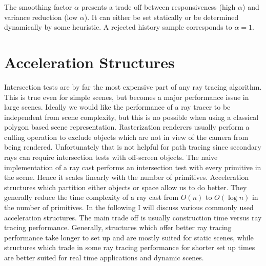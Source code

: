 \documentclass{ACGSeminar}
\begin{document}
The smoothing factor $\alpha$ presents a trade off between responsiveness (high $\alpha$) and variance reduction (low $\alpha$). It can either be set statically or be determined dynamically by some heuristic. A rejected history sample corresponds to $\alpha = 1$. 


\section{Acceleration Structures} \label{acceleration}
Intersection tests are by far the most expensive part of any ray tracing algorithm. \cite[7]{Whitted:1980} This is true even for simple scenes, but becomes a major performance issue in large scenes. Ideally we would like the performance of a ray tracer to be independent from scene complexity, but this is no possible when using a classical polygon based scene representation.
Rasterization renderers usually perform a culling operation to exclude objects which are not in view of the camera from being rendered. Unfortunately that is not helpful for path tracing since secondary rays can require intersection tests with off-screen objects.
The naive implementation of a ray cast performs an intersection test with every primitive in the scene. Hence it scales linearly with the number of primitives. Acceleration structures which partition either objects or space allow us to do better. They generally reduce the time complexity of a ray cast from $O(n)$ to $O(\log n)$ in the number of primitives. In the following I will discuss various commonly used acceleration structures. The main trade off is usually construction time versus ray tracing performance. Generally, structures which offer better ray tracing performance take longer to set up and are mostly suited for static scenes, while structures which trade in some ray tracing performance for shorter set up times are better suited for real time applications and dynamic scenes. \cite{Karras:2012:MPC:2383795.2383801}
\end{document}
